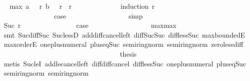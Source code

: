 \begin{isabellebody}
\ \isamarkupfalse%
\ {\isachardoublequoteopen}max\ {\isacharparenleft}a\ {\isacharparenleft}{}{}{}{}\ {\isacharminus}\ r{\isacharparenright}{\isacharparenright}\ {\isacharparenleft}b\ {\isacharparenleft}{}{}{}{}\ {\isacharminus}\ r{\isacharparenright}{\isacharparenright}\ {\isasymle}\ {\isacharquery}r{\isachardoublequoteclose}\isanewline
\ \ \ \ \ \ \ \ \ \ \ \ \isamarkupfalse%
\ {\isacharparenleft}induction\ r{\isacharparenright}\isanewline
\ \ \ \ \ \ \ \ \ \ \ \ \ \ \isamarkupfalse%
\ {}\isanewline
\ \ \ \ \ \ \ \ \ \ \ \ \ \ \isamarkupfalse%
\ {\isacharquery}case\isanewline
\ \ \ \ \ \ \ \ \ \ \ \ \ \ \ \ \isamarkupfalse%
\ simp\isanewline
\ \ \ \ \ \ \ \ \ \ \ \ \isamarkupfalse%
\isanewline
\ \ \ \ \ \ \ \ \ \ \ \ \ \ \isamarkupfalse%
\ {\isacharparenleft}Suc\ r{\isacharparenright}\isanewline
\ \ \ \ \ \ \ \ \ \ \ \ \ \ \isamarkupfalse%
\ {\isacharquery}case\isanewline
\ \ \ \ \ \ \ \ \ \ \ \ \ \ \ \ \isamarkupfalse%
\ max{\isacharunderscore}max\ {\isacharasterisk}{\isacharparenleft}{}{\isacharminus}{}{\isacharparenright}\isanewline
\ \ \ \ \ \ \ \ \ \ \ \ \ \ \ \ \isamarkupfalse%
\ {\isacharparenleft}smt\ Suc{\isacharunderscore}diff{\isacharunderscore}Suc\ Suc{\isacharunderscore}lessD\ add{\isacharunderscore}diff{\isacharunderscore}cancel{\isacharunderscore}left{\isacharprime}\ diff{\isacharunderscore}Suc{\isacharunderscore}Suc\ diff{\isacharunderscore}less{\isacharunderscore}Suc\ max{\isachardot}boundedE\ max{\isachardot}orderE\ one{\isacharunderscore}plus{\isacharunderscore}numeral\ plus{\isacharunderscore}{}{\isacharunderscore}eq{\isacharunderscore}Suc\ semiring{\isacharunderscore}norm{\isacharparenleft}{}{\isacharparenright}\ semiring{\isacharunderscore}norm{\isacharparenleft}{}{\isacharparenright}\ zero{\isacharunderscore}less{\isacharunderscore}diff{\isacharparenright}\isanewline
\ \ \ \ \ \ \ \ \ \ \ \ \isamarkupfalse%
\isanewline
\ \ \ \ \ \ \ \ \ \ \isamarkupfalse%
\isanewline
\ \ \ \ \ \ \ \ \ \ \isamarkupfalse%
\ {\isacharquery}thesis\isanewline
\ \ \ \ \ \ \ \ \ \ \ \ \isamarkupfalse%
\ {\isacharparenleft}metis\ Suc{\isacharunderscore}leI\ add{\isacharunderscore}le{\isacharunderscore}cancel{\isacharunderscore}left\ diff{\isacharunderscore}diff{\isacharunderscore}cancel\ diff{\isacharunderscore}less{\isacharunderscore}Suc\ one{\isacharunderscore}plus{\isacharunderscore}numeral\ plus{\isacharunderscore}{}{\isacharunderscore}eq{\isacharunderscore}Suc\ semiring{\isacharunderscore}norm{\isacharparenleft}{}{\isacharparenright}\ semiring{\isacharunderscore}norm{\isacharparenleft}{}{\isacharparenright}{\isacharparenright}\isanewline

\end{isabellebody}
